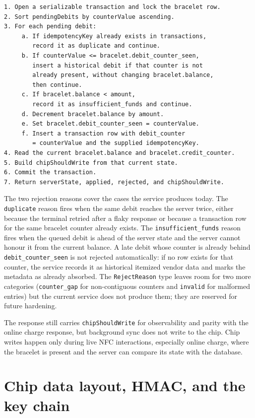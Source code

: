 \begin{verbatim}
1. Open a serializable transaction and lock the bracelet row.
2. Sort pendingDebits by counterValue ascending.
3. For each pending debit:
     a. If idempotencyKey already exists in transactions,
        record it as duplicate and continue.
     b. If counterValue <= bracelet.debit_counter_seen,
        insert a historical debit if that counter is not
        already present, without changing bracelet.balance,
        then continue.
     c. If bracelet.balance < amount,
        record it as insufficient_funds and continue.
     d. Decrement bracelet.balance by amount.
     e. Set bracelet.debit_counter_seen = counterValue.
     f. Insert a transaction row with debit_counter
        = counterValue and the supplied idempotencyKey.
4. Read the current bracelet.balance and bracelet.credit_counter.
5. Build chipShouldWrite from that current state.
6. Commit the transaction.
7. Return serverState, applied, rejected, and chipShouldWrite.
\end{verbatim}

The two rejection reasons cover the cases the service produces today. The \texttt{duplicate} reason fires when the same debit reaches the server twice, either because the terminal retried after a flaky response or because a transaction row for the same bracelet counter already exists. The \texttt{insufficient\_funds} reason fires when the queued debit is ahead of the server state and the server cannot honour it from the current balance. A late debit whose counter is already behind \texttt{debit\_counter\_seen} is not rejected automatically: if no row exists for that counter, the service records it as historical itemized vendor data and marks the metadata as already absorbed. The \texttt{RejectReason} type leaves room for two more categories (\texttt{counter\_gap} for non-contiguous counters and \texttt{invalid} for malformed entries) but the current service does not produce them; they are reserved for future hardening.

The response still carries \texttt{chipShouldWrite} for observability and parity with the online charge response, but background sync does not write to the chip. Chip writes happen only during live NFC interactions, especially online charge, where the bracelet is present and the server can compare its state with the database.

\section{Chip data layout, HMAC, and the key chain}
\label{sec:impl-chip-layout}

